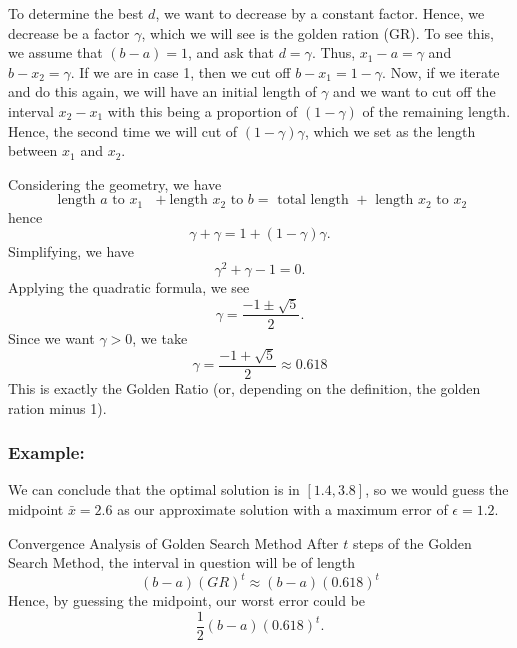 To determine the best $d$, we want to decrease by a constant factor.  Hence, we decrease be a factor $\gamma$, which we will see is the golden ration (GR).  To see this, we assume that $(b-a) = 1$, and ask that $d = \gamma$.  Thus, $x_1 - a = \gamma$ and $b - x_2 = \gamma$.  If we are in case 1, then we cut off $b-x_1 = 1-\gamma$.  Now, if we iterate and do this again, we will have an initial length of $\gamma$ and we want to cut off the interval $x_2 - x_1$ with this being a proportion of $(1-\gamma)$ of the remaining length.  Hence, the second time we will cut of $(1-\gamma)\gamma$, which we set as the length between $x_1$ and $x_2$.  

Considering the geometry, we have
$$
\text{ length $a$ to $x_1$ } + \text{length $x_2$ to $b$} = \text{ total length } + \text{ length $x_2$ to $x_2$}
$$ 
hence
$$
\gamma + \gamma = 1 + (1-\gamma)\gamma.
$$
Simplifying, we have
$$
\gamma^2 + \gamma - 1 = 0.
$$
Applying the quadratic formula, we see
$$
\gamma = \frac{-1 \pm \sqrt{5}}{2}.
$$
Since we want $\gamma > 0$, we take 
$$
\gamma = \frac{-1 + \sqrt{5}}{2} \approx 0.618
$$
This is exactly the Golden Ratio (or, depending on the definition, the golden ration minus 1).



\subsubsection{Example:}

We can conclude that the optimal solution is in $[1.4,3.8]$, so we would guess the midpoint $\bar x = 2.6$ as our approximate solution with a maximum error of $\epsilon = 1.2$.

\begin{general}{Convergence Analysis of Golden Search Method}{}
After $t$ steps of the Golden Search Method, the interval in question will be of length
$$
(b-a)(GR)^t \approx (b-a)(0.618)^t
$$
Hence, by guessing the midpoint, our worst error could be
$$
\frac{1}{2}(b-a)(0.618)^t.
$$
\end{general}






